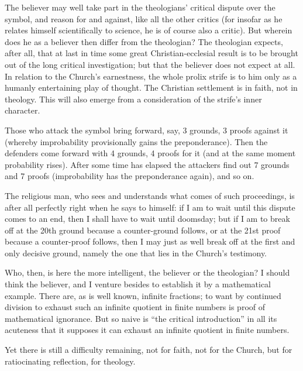 \documentclass[12pt,a4paper]{book}
\begin{document}
The believer may well take part in the theologians' critical dispute over the
symbol, and reason for and against, like all the other critics (for insofar as
he relates himself scientifically to science, he is of course also a critic).
But wherein does he as a believer then differ from the theologian? The
theologian expects, after all, that at last in time some great
Christian-ecclesial result is to be brought out of the long critical
investigation; but that the believer does not expect at all. In relation to the
Church's earnestness, the whole prolix strife is to him only as a humanly
entertaining play of thought. The Christian
settlement is in faith, not in theology. This will also emerge from a
consideration of the strife's inner character.

Those who attack the symbol bring forward, say, 3 grounds, 3 proofs against it
(whereby improbability provisionally gains the preponderance). Then the
defenders come forward with 4 grounds, 4 proofs for it (and at the same moment
probability rises). After some time has elapsed the attackers find out 7 grounds
and 7 proofs (improbability has the preponderance again), and so on.

The religious man, who sees and understands what comes of such proceedings, is
after all perfectly right when he says to himself: if I am to wait until this
dispute comes to an end, then I shall have to wait until doomsday; but if I am
to break off at the 20th ground because a counter-ground follows, or at the 21st
proof because a counter-proof follows, then I may just as well break off at the
first and only decisive ground, namely the one that lies in the Church's
testimony.

Who, then, is here the more intelligent, the believer or the theologian? I
should think the believer, and I venture besides to establish it by a
mathematical example. There are, as is well known, infinite fractions; to want
by continued division to exhaust such an infinite quotient in finite numbers is
proof of mathematical ignorance. But so naive is ``the critical introduction''
in all its acuteness that it supposes it can exhaust an infinite quotient in
finite numbers.

Yet there is still a difficulty remaining, not for faith, not for the Church,
but for ratiocinating reflection, for theology.
\end{document}
